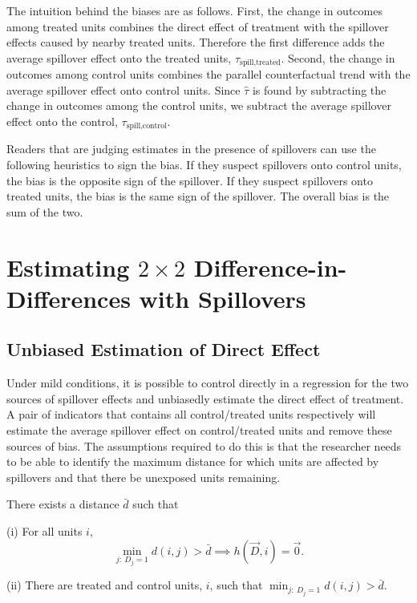 \documentclass[11pt]{article}
\begin{document}
The intuition behind the biases are as follows. First, the change in outcomes among treated units combines the direct effect of treatment with the spillover effects caused by nearby treated units. Therefore the first difference adds the average spillover effect onto the treated units, $\tau_{\text{spill,treated}}$. Second, the change in outcomes among control units combines the parallel counterfactual trend with the average spillover effect onto control units. Since $\hat{\tau}$ is found by subtracting the change in outcomes among the control units, we subtract the average spillover effect onto the control, $\tau_{\text{spill,control}}$. 

Readers that are judging estimates in the presence of spillovers can use the following heuristics to sign the bias. If they suspect spillovers onto control units, the bias is the opposite sign of the spillover. If they suspect spillovers onto treated units, the bias is the same sign of the spillover. The overall bias is the sum of the two.



\section{Estimating $2\times 2$ Difference-in-Differences with Spillovers}
\label{sec:estimation}

\subsection{Unbiased Estimation of Direct Effect}\label{sec:remove_bias}

Under mild conditions, it is possible to control directly in a regression for the two sources of spillover effects and unbiasedly estimate the direct effect of treatment. A pair of indicators that contains all control/treated units respectively will estimate the average spillover effect on control/treated units and remove these sources of bias. The assumptions required to do this is that the researcher needs to be able to identify the maximum distance for which units are affected by spillovers and that there be unexposed units remaining.

\begin{assumption}\label{assumption:local}
    There exists a distance $\bar{d}$ such that 
    
    (i) For all units $i$,
    \[ 
        \min_{j: \ D_j = 1} d(i,j) > \bar{d} \implies h(\vec{D}, i) = \vec{0}. 
    \]

    (ii) There are treated and control units, $i$, such that $\min_{j: \ D_j = 1} d(i,j) > \bar{d}$.


\end{assumption}
\end{document}
